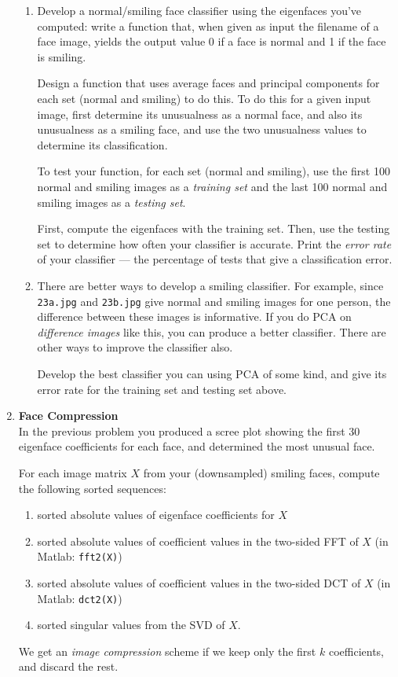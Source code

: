 \documentclass[10pt]{article}
\begin{document}
\begin{enumerate}
\begin{enumerate}
\item
Develop a normal/smiling face classifier using the eigenfaces you've computed:
write a function that, when given as input the filename of a face image,
yields the output value 0 if a face is normal and 1 if the face is smiling.

Design a function that uses average faces and principal components for each set (normal and smiling) to do this.
To do this for a given input image, first determine its unusualness as a normal face,
and also its unusualness as a smiling face,
and use the two unusualness values to determine its classification.

To test your function, for each set (normal and smiling),
use the first 100 normal and smiling images as a \emph{training set}
and the last 100 normal and smiling images as a \emph{testing set}.

First, compute the eigenfaces with the training set.
Then, use the testing set to determine how often your classifier is accurate.
Print the \emph{error rate} of your classifier --- the percentage of tests that give a classification error.


\item
There are better ways to develop a smiling classifier.
For example, since \verb"23a.jpg" and \verb"23b.jpg" give normal and smiling images for one person,
the difference between these images is informative.
If you do PCA on \emph{difference images} like this,
you can produce a better classifier.
There are other ways to improve the classifier also.

Develop the best classifier you can using PCA of some kind,
and give its error rate for the training set and testing set above.








\end{enumerate}


\item {\bf Face Compression} \\
In the previous problem you produced a scree plot showing the first 30 eigenface coefficients for each face,
and determined the most unusual face.

For each image matrix $X$ from your (downsampled) smiling faces, compute the following sorted sequences:
\begin{enumerate}
 \item  sorted absolute values of eigenface coefficients for $X$
 \item  sorted absolute values of coefficient values in the two-sided FFT of $X$  (in Matlab: \verb"fft2(X)")
 \item  sorted absolute values of coefficient values in the two-sided DCT of $X$  (in Matlab: \verb"dct2(X)")
 \item  sorted singular values from the SVD of $X$.
\end{enumerate}
We get an \emph{image compression} scheme if we keep only the first $k$ coefficients, and discard the rest.


\end{enumerate}
\end{document}
